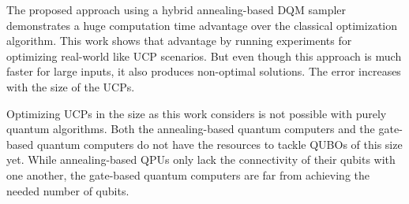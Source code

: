The proposed approach using a hybrid annealing-based DQM sampler demonstrates a huge computation time advantage over the classical optimization algorithm.
This work shows that advantage by running experiments for optimizing real-world like UCP scenarios.
But even though this approach is much faster for large inputs, it also produces non-optimal solutions.
The error increases with the size of the UCPs.

Optimizing UCPs in the size as this work considers is not possible with purely quantum algorithms.
Both the annealing-based quantum computers and the gate-based quantum computers do not have the resources to tackle QUBOs of this size yet.
While annealing-based QPUs only lack the connectivity of their qubits with one another, the gate-based quantum computers are far from achieving the needed number of qubits.
